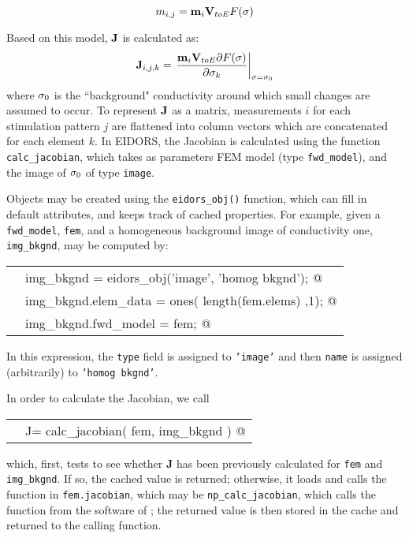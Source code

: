 \documentclass[12pt]{iopart}
\makeatletter
\newcommand{\CODEstart}{\medskip\begin{tabular}{ll}}
\newcommand{\CN}{\tt\scriptsize} %
\newcommand{\CC}{&\small\verb@}   % start code
\newcommand{\CODEend}{\end{tabular}\medskip}
\makeatother
\begin{document}
\begin{equation}
m_{i,j} = {\bf m}_{i} {\bf V}_{toE} F({\bf \sigma})
\end{equation}

Based on this model, $\bf J$ is calculated as:
\begin{equation}
{\bf J}_{i,j,k} = \left.\frac{
 {\bf m}_{i} {\bf V}_{toE}{\partial}F({\bf \sigma})
}{
{\partial}{\bf \sigma}_k
}
\right|_{
   {\bf \sigma} = {\bf \sigma}_0 
}
\end{equation}
where ${\bf \sigma}_0$ is the ``background"
conductivity around which small changes are assumed to occur.
To represent $\bf J$ as a matrix, measurements $i$ for each stimulation
pattern $j$ are flattened into column vectors which are concatenated
for each element $k$.
In EIDORS, the Jacobian is calculated using the function
{\tt calc\_jacobian},
which takes as parameters FEM model (type {\tt fwd\_model}),
and the image of ${\bf \sigma}_0$ 
of type {\tt image}.

Objects may be created using the {\tt eidors\_obj()}
function, which can fill in default attributes, and 
keeps track of cached properties.
For example, given a {\tt fwd\_model}, {\tt fem}, and
a homogeneous background image of conductivity one,
{\tt img\_bkgnd}, may be computed by:

\CODEstart
\CN    \CC img_bkgnd           = eidors_obj('image', 'homog bkgnd'); @\\[-3pt]
\CN    \CC img_bkgnd.elem_data = ones( length(fem.elems) ,1); @\\[-3pt]
\CN    \CC img_bkgnd.fwd_model = fem; @\\[-3pt]
\CODEend

In this expression, the {\tt type} field is assigned
to {\tt 'image'} and then {\tt name} is assigned
(arbitrarily) to {\tt 'homog bkgnd'}.

In order to calculate the Jacobian, we call

\CODEstart
\CN    \CC J= calc_jacobian( fem, img_bkgnd ) @\\[-3pt]
\CODEend

which, first, tests to see whether {\bf J} has been previously
calculated for {\tt fem} and {\tt img\_bkgnd}. If
so, the cached value is returned; otherwise,
it loads and calls the function in {\tt fem.jacobian},
which may be {\tt np\_calc\_jacobian}, which 
calls the function from the software of
\cite{Polydorides_and_Lionheart_2002}; the returned
value is then stored in the cache and returned to the
calling function.
\end{document}
